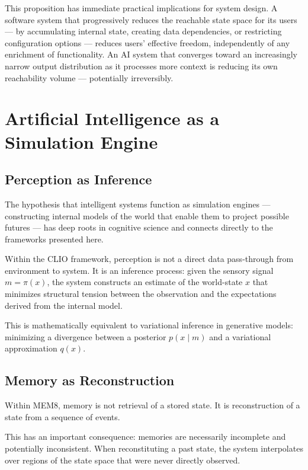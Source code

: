\documentclass[11pt, a4paper]{article}
\theoremstyle{named}
\begin{document}
This proposition has immediate practical implications for system
design. A software system that progressively reduces the reachable
state space for its users --- by accumulating internal state, creating
data dependencies, or restricting configuration options --- reduces
users' effective freedom, independently of any enrichment of
functionality. An AI system that converges toward an increasingly
narrow output distribution as it processes more context is reducing
its own reachability volume --- potentially irreversibly.

\section{Artificial Intelligence as a Simulation Engine}

\subsection{Perception as Inference}

The hypothesis that intelligent systems function as simulation engines
--- constructing internal models of the world that enable them to
project possible futures --- has deep roots in cognitive science and
connects directly to the frameworks presented here.

Within the CLIO framework, perception is not a direct data pass-through
from environment to system. It is an inference process: given the
sensory signal $m = \pi(x)$, the system constructs an estimate of the
world-state $x$ that minimizes structural tension between the
observation and the expectations derived from the internal model.

This is mathematically equivalent to variational inference in
generative models: minimizing a divergence between a posterior
$p(x \mid m)$ and a variational approximation $q(x)$.

\subsection{Memory as Reconstruction}

Within MEM\textbar{}8, memory is not retrieval of a stored state. It
is reconstruction of a state from a sequence of events.

This has an important consequence: memories are necessarily incomplete
and potentially inconsistent. When reconstituting a past state, the
system interpolates over regions of the state space that were never
directly observed.
\end{document}

